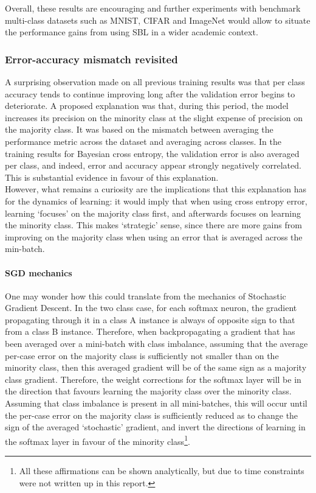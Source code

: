 \documentclass[a4paper,11pt]{article}
\begin{document}
Overall, these results are encouraging and further experiments with benchmark multi-class datasets such as MNIST, CIFAR and ImageNet would allow to situate the performance gains from using SBL in a wider academic context. 


\subsubsection{Error-accuracy mismatch revisited}

A surprising observation made on all previous training results was that per class accuracy tends to continue improving long after the validation error begins to deteriorate. A proposed explanation was that, during this period, the model increases its precision on the minority class at the slight expense of precision on the majority class. It was based on the mismatch between averaging the performance metric across the dataset and averaging across classes. In the training results for Bayesian cross entropy, the validation error is also averaged per class, and indeed, error and accuracy appear strongly negatively correlated. This is substantial evidence in favour of this explanation. \\

However, what remains a curiosity are the implications that this explanation has for the dynamics of learning: it would imply that when using cross entropy error, learning `focuses' on the majority class first, and afterwards focuses on learning the minority class. This makes `strategic' sense, since there are more gains from improving on the majority class when using an error that is averaged across the min-batch. 


\paragraph{SGD mechanics}

One may wonder how this could translate from the mechanics of Stochastic Gradient Descent. In the two class case, for each softmax neuron, the gradient propagating through it in a class A instance is always of opposite sign to that from a class B instance. Therefore, when backpropagating a gradient that has been averaged over a mini-batch with class imbalance, assuming that the average per-case error on the majority class is sufficiently not smaller than on the minority class, then this averaged gradient will be of the same sign as a majority class gradient. Therefore, the weight corrections for the softmax layer will be in the direction that favours learning the majority class over the minority class. Assuming that class imbalance is present in all mini-batches, this will occur until the per-case error on the majority class is sufficiently reduced as to change the sign of the averaged `stochastic' gradient, and invert the directions of learning in the softmax layer in favour of the minority class\footnote{All these affirmations can be shown analytically, but due to time constraints were not written up in this report.}. \\
\end{document}
